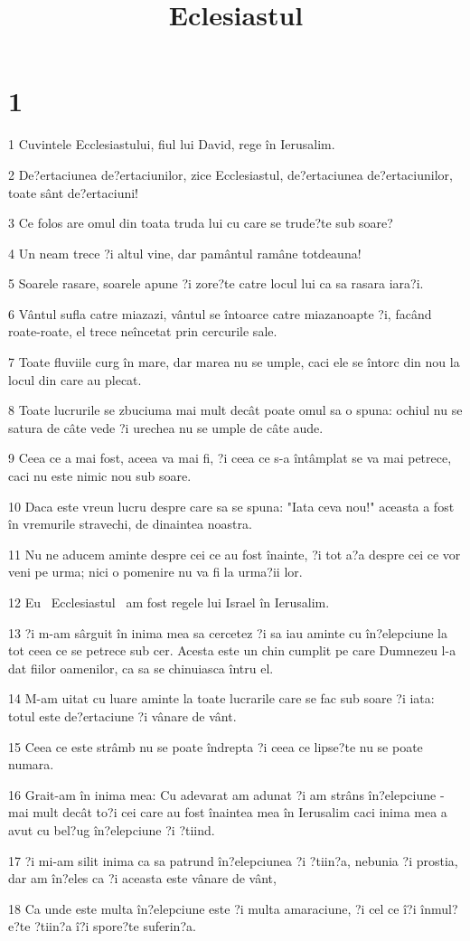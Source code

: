 

\title{Eclesiastul}


\chapter{1}

\par 1 Cuvintele Ecclesiastului, fiul lui David, rege în Ierusalim.
\par 2 De?ertaciunea de?ertaciunilor, zice Ecclesiastul, de?ertaciunea de?ertaciunilor, toate sânt de?ertaciuni!
\par 3 Ce folos are omul din toata truda lui cu care se trude?te sub soare?
\par 4 Un neam trece ?i altul vine, dar pamântul ramâne totdeauna!
\par 5 Soarele rasare, soarele apune ?i zore?te catre locul lui ca sa rasara iara?i.
\par 6 Vântul sufla catre miazazi, vântul se întoarce catre miazanoapte ?i, facând roate-roate, el trece neîncetat prin cercurile sale.
\par 7 Toate fluviile curg în mare, dar marea nu se umple, caci ele se întorc din nou la locul din care au plecat.
\par 8 Toate lucrurile se zbuciuma mai mult decât poate omul sa o spuna: ochiul nu se satura de câte vede ?i urechea nu se umple de câte aude.
\par 9 Ceea ce a mai fost, aceea va mai fi, ?i ceea ce s-a întâmplat se va mai petrece, caci nu este nimic nou sub soare.
\par 10 Daca este vreun lucru despre care sa se spuna: "Iata ceva nou!" aceasta a fost în vremurile stravechi, de dinaintea noastra.
\par 11 Nu ne aducem aminte despre cei ce au fost înainte, ?i tot a?a despre cei ce vor veni pe urma; nici o pomenire nu va fi la urma?ii lor.
\par 12 Eu  Ecclesiastul  am fost regele lui Israel în Ierusalim.
\par 13 ?i m-am sârguit în inima mea sa cercetez ?i sa iau aminte cu în?elepciune la tot ceea ce se petrece sub cer. Acesta este un chin cumplit pe care Dumnezeu l-a dat fiilor oamenilor, ca sa se chinuiasca întru el.
\par 14 M-am uitat cu luare aminte la toate lucrarile care se fac sub soare ?i iata: totul este de?ertaciune ?i vânare de vânt.
\par 15 Ceea ce este strâmb nu se poate îndrepta ?i ceea ce lipse?te nu se poate numara.
\par 16 Grait-am în inima mea: Cu adevarat am adunat ?i am strâns în?elepciune - mai mult decât to?i cei care au fost înaintea mea în Ierusalim caci inima mea a avut cu bel?ug în?elepciune ?i ?tiind.
\par 17 ?i mi-am silit inima ca sa patrund în?elepciunea ?i ?tiin?a, nebunia ?i prostia, dar am în?eles ca ?i aceasta este vânare de vânt,
\par 18 Ca unde este multa în?elepciune este ?i multa amaraciune, ?i cel ce î?i înmul?e?te ?tiin?a î?i spore?te suferin?a.

